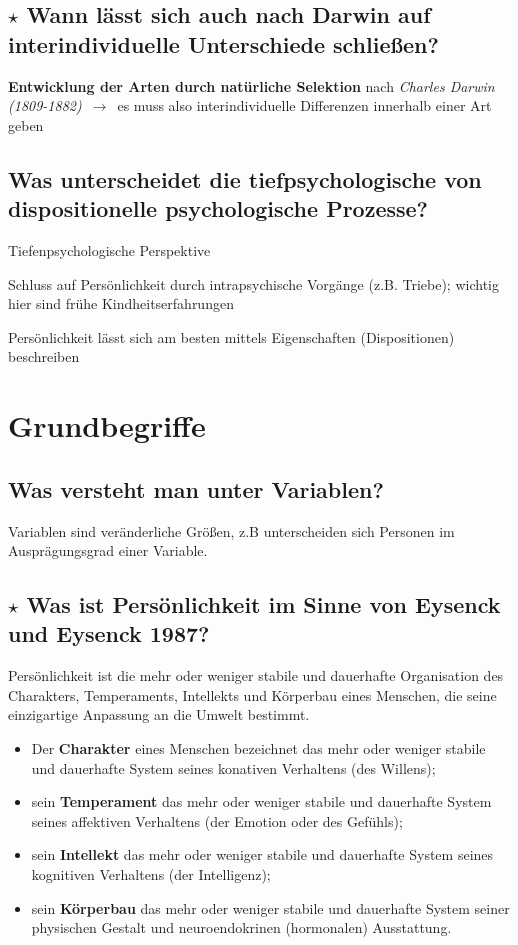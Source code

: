 \documentclass[a4paper,9pt,DIV=14]{scrartcl}
\begin{document}
\subsection{$\star$ Wann lässt sich auch nach Darwin auf interindividuelle Unterschiede schließen?}  %
    \textbf{Entwicklung der Arten durch natürliche Selektion} nach \textit{Charles Darwin (1809-1882)} $\,\to\,$ es muss also interindividuelle Differenzen innerhalb einer Art geben
\subsection{Was unterscheidet die tiefpsychologische von dispositionelle psychologische Prozesse?}
    \begin{labeling}{Tiefenpsychologische Perspektive}
    \item [Tiefenpsychologische Perspektive] Schluss auf Persönlichkeit durch intrapsychische Vorgänge (z.B. Triebe); wichtig hier sind frühe Kindheitserfahrungen
    \item [Dispositionelle Perspektive] Persönlichkeit lässt sich am besten mittels Eigenschaften (Dispositionen) beschreiben
    \end{labeling}



\section{Grundbegriffe}

\subsection{Was versteht man unter Variablen?}
    Variablen sind veränderliche Größen, z.B unterscheiden sich Personen im Ausprägungsgrad einer Variable.
\subsection{$\star$ Was ist Persönlichkeit im Sinne von Eysenck und Eysenck 1987?} %
    Persönlichkeit ist die mehr oder weniger stabile und dauerhafte Organisation des Charakters, Temperaments, Intellekts und Körperbau eines Menschen, die seine einzigartige Anpassung an die Umwelt bestimmt.
    \begin{itemize}\itemsep-0.5ex
        \item Der \textbf{Charakter} eines Menschen bezeichnet das mehr oder weniger stabile und dauerhafte System seines konativen Verhaltens (des Willens);
        \item sein \textbf{Temperament} das mehr oder weniger stabile und dauerhafte System seines affektiven Verhaltens (der Emotion oder des Gefühls);
        \item sein \textbf{Intellekt} das mehr oder weniger stabile und dauerhafte System seines kognitiven Verhaltens (der Intelligenz);
        \item sein \textbf{Körperbau} das mehr oder weniger stabile und dauerhafte System seiner physischen Gestalt und neuroendokrinen (hormonalen) Ausstattung.
    \end{itemize}
\end{document}
